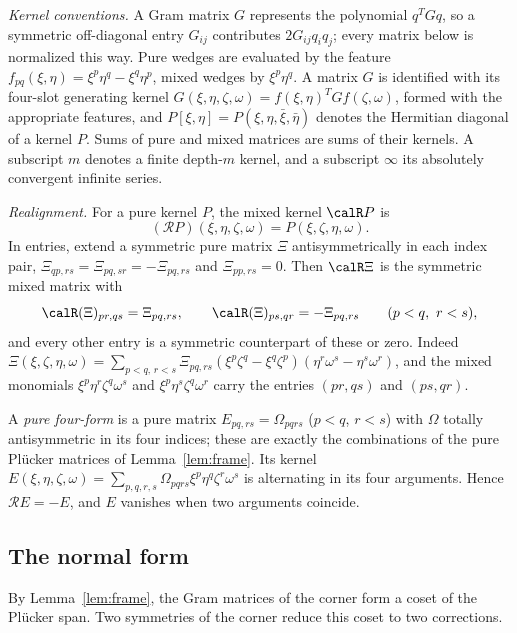 \emph{Kernel conventions.} A Gram matrix $G$ represents the polynomial
\(q^TGq\), so a symmetric off-diagonal entry \(G_{ij}\) contributes
\(2G_{ij}q_iq_j\); every matrix below is normalized this way. Pure
wedges are evaluated by the feature
\(f_{pq}(\xi,\eta)=\xi^p\eta^q-\xi^q\eta^p\), mixed wedges by
\(\xi^p\eta^q\). A matrix $G$ is identified with its four-slot
generating kernel $G(\xi,\eta,\zeta,\omega)=f(\xi,\eta)^TGf(\zeta,\omega)$,
formed with the appropriate features, and
\(P[\xi,\eta]=P(\xi,\eta,\bar \xi,\bar \eta)\) denotes the Hermitian
diagonal of a kernel $P$. Sums of pure and mixed matrices are sums of
their kernels. A subscript $m$ denotes a finite depth-$m$ kernel, and a
subscript $\infty$ its absolutely convergent infinite series.

\emph{Realignment.} For a pure kernel $P$, the mixed kernel $\calR P$ is
\begin{equation}
 (\mathcal RP)(\xi,\eta,\zeta,\omega)=P(\xi,\zeta,\eta,\omega).                    \label{eq:realignment-kernel}
\end{equation}
In entries, extend a symmetric pure matrix $\Xi$ antisymmetrically in
each index pair, $\Xi_{qp,rs}=\Xi_{pq,sr}=-\Xi_{pq,rs}$ and
$\Xi_{pp,rs}=0$. Then $\calR\Xi$ is the symmetric mixed matrix with
\begin{equation}\label{eq:realignment-entries}
 \calR(\Xi)_{pr,qs}=\Xi_{pq,rs},\qquad
 \calR(\Xi)_{ps,qr}=-\Xi_{pq,rs}\qquad(p<q,\ r<s),
\end{equation}
and every other entry is a symmetric counterpart of these or zero.
Indeed
$\Xi(\xi,\zeta,\eta,\omega)=\sum_{p<q,\,r<s}\Xi_{pq,rs}
(\xi^p\zeta^q-\xi^q\zeta^p)(\eta^r\omega^s-\eta^s\omega^r)$, and the
mixed monomials $\xi^p\eta^r\zeta^q\omega^s$ and
$\xi^p\eta^s\zeta^q\omega^r$ carry the entries $(pr,qs)$ and $(ps,qr)$.

A \emph{pure four-form} is a pure matrix $E_{pq,rs}=\Omega_{pqrs}$
($p<q$, $r<s$) with $\Omega$ totally antisymmetric in its four indices;
these are exactly the combinations of the pure Pl\"ucker matrices of
Lemma~\ref{lem:frame}. Its kernel
$E(\xi,\eta,\zeta,\omega)=\sum_{p,q,r,s}\Omega_{pqrs}\xi^p\eta^q\zeta^r\omega^s$
is alternating in its four arguments. Hence $\mathcal RE=-E$, and $E$
vanishes when two arguments coincide.

\subsection{The normal form}
By Lemma~\ref{lem:frame}, the Gram matrices of the corner form a coset of
the Pl\"ucker span. Two symmetries of the corner reduce this coset to
two corrections.

